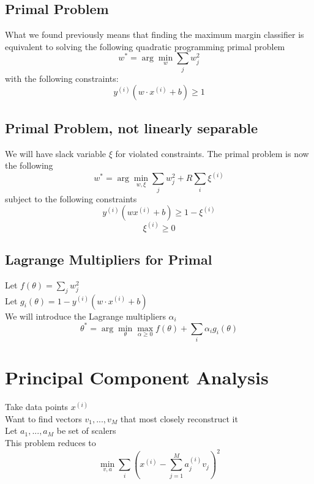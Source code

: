 \documentclass[twoside,11pt]{article}
\theoremstyle{definition}
\begin{document}
\newpage

\subsection{Primal Problem}

What we found previously means that finding the maximum margin classifier is equivalent to solving the following quadratic programming primal problem
\[
w^{*} = \arg \min_{w} \sum_j w_j^2
\]
with the following constraints:
\[
y^{(i)} ( w \cdot x^{(i)} + b) \geq 1
\]

\subsection{Primal Problem, not linearly separable}

We will have slack variable $\xi$ for violated constraints. The primal problem is now the following
\[
w^{*} = \arg \min_{w,\xi} \sum_j w_j^2 + R \sum_i \xi^{(i)}
\]
subject to the following constraints
\[
y^{(i)} (w x^{(i)} + b) \geq 1 - \xi^{(i)}
\]
\[
\xi^{(i)} \geq 0
\]

\subsection{Lagrange Multipliers for Primal}

Let $f(\theta) = \sum_j {w_j^2}$\\
Let $g_i(\theta) = 1-y^{(i)}(w \cdot x^{(i)} + b)$\\
We will introduce the Lagrange multipliers $\alpha_i$\\
\[
\theta^* = \arg \min_{\theta} \max_{\alpha \geq 0} f(\theta) + \sum_i \alpha_i g_i(\theta)
\]

\newpage

\section{Principal Component Analysis}

Take data points $x^{(i)}$\\
Want to find vectors $v_1,...,v_M$ that most closely reconstruct it\\
Let $a_1,...,a_M$ be set of scalers\\
This problem reduces to
\[
\min_{v,a} \sum_{i} (x^{(i)} - \sum_{j=1}^M a_j^{(i)}v_j)^2
\]
\end{document}
